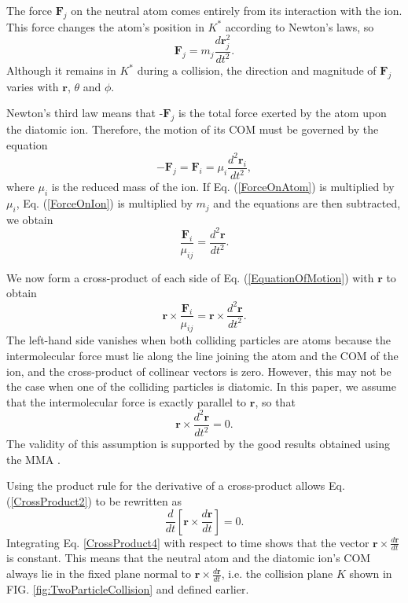 \documentclass[article]{revtex4-2}
\begin{document}
The force $\textbf{F}_j$ on the neutral atom comes entirely from its interaction with the ion. This force changes the atom's position in $K^*$ according to Newton's laws, so
\begin{equation}
    \textbf{F}_j = m_j \frac{d\textbf{r}_j^2}{dt^2}.
    \label{ForceOnAtom}
\end{equation}
Although it remains in $K^*$ during a collision, the direction and magnitude of $\textbf{F}_j$ varies with $\textbf{r}$, $\theta$ and $\phi$.

Newton's third law means that -$\textbf{F}_j$ is the total force exerted by the atom upon the diatomic ion.  Therefore, the motion of its COM must be governed by the equation
\begin{equation}
    - \textbf{F}_j = \textbf{F}_i = \mu_i\frac{d^2\textbf{r}_i}{dt^2},
    \label{ForceOnIon}
\end{equation}
where $\mu_i$ is the reduced mass of the ion. If Eq. (\ref{ForceOnAtom}) is multiplied by $\mu_i$, Eq. (\ref{ForceOnIon}) is multiplied by $m_j$ and the equations are then subtracted, we obtain
\begin{equation}
    \frac{\textbf{F}_i}{\mu_{ij}} = \frac{d^2\mathbf{r}}{dt^2}.
    \label{EquationOfMotion}
\end{equation}

We now form a cross-product of each side of Eq. (\ref{EquationOfMotion}) with $\mathbf{r}$ to obtain
\begin{equation}
    \mathbf{r} \times \frac{\textbf{F}_i}{\mu_{ij}} = \mathbf{r} \times \frac{d^2 \mathbf{r}}{dt^2}.
    \label{CrossProduct1}
\end{equation}
The left-hand side vanishes when both colliding particles are atoms because the intermolecular force must lie along the line joining the atom and the COM of the ion, and the cross-product of collinear vectors is zero. However, this may not be the case when one of the colliding particles is diatomic. In this paper, we assume that the intermolecular force is exactly parallel to $\mathbf{r}$, so that
\begin{equation}
    \mathbf{r} \times \frac{d^2 \mathbf{r}}{dt^2} = 0.
    \label{CrossProduct2}
\end{equation}
The validity of this assumption is supported by the good results obtained using the MMA \cite{skullerud2021}.

Using the product rule for the derivative of a cross-product allows Eq. (\ref{CrossProduct2}) to be rewritten as
\begin{equation}
    \frac{d}{dt} \left[ \mathbf{r} \times \frac{d \mathbf{r}}{dt} \right] = 0.
    \label{CrossProduct4}
\end{equation}
Integrating Eq. \ref{CrossProduct4} with respect to time shows that the vector $\mathbf{r} \times \frac{d \mathbf{r}}{dt}$ is constant. This means that the neutral atom and the diatomic ion's COM always lie in the fixed plane normal to $\mathbf{r} \times \frac{d \mathbf{r}}{dt}$, i.e. the collision plane $K$ shown in FIG. \ref{fig:TwoParticleCollision} and defined earlier.
\end{document}
